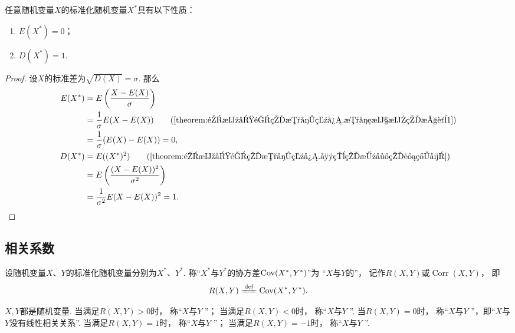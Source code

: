 \begin{property}\label{theorem:随机变量的数字特征.标准化随机变量的数字特征}
任意随机变量\(X\)的标准化随机变量\(X^*\)具有以下性质：
\begin{enumerate}
    \item \(E(X^*)=0\)；
    \item \(D(X^*)=1\).
\end{enumerate}
\begin{proof}
设\(X\)的标准差为\(\sqrt{D(X)}=\sigma\).
那么\begin{align*}
    E(X^*)
	&= E\left(\frac{X-E(X)}{\sigma}\right) \\
	&= \frac1\sigma E(X-E(X))
		\tag{\cref{theorem:随机变量的数字特征.数学期望的性质1}} \\
	&= \frac1\sigma (E(X) - E(X))
	= 0, \\
    D(X^*)
	&= E((X^*)^2)
		\tag{\cref{theorem:随机变量的数字特征.常用的方差的计算式}} \\
	&= E\left(\frac{(X-E(X))^2}{\sigma^2}\right) \\
	&= \frac{1}{\sigma^2} E(X-E(X))^2
	= 1.
    \qedhere
\end{align*}
\end{proof}
\end{property}

\subsection{相关系数}
\begin{definition}\label{definition:随机变量的数字特征.相关系数}
设随机变量\(X\)、\(Y\)的标准化随机变量分别为\(X^*\)、\(Y^*\).
称“\(X^*\)与\(Y^*\)的协方差\(\operatorname{Cov}(X^*,Y^*)\)”为
“\(X\)与\(Y\)的”，
记作\(R(X,Y)\)或\(\operatorname{Corr}(X,Y)\)，
即\[
    R(X,Y) \defeq \Cov(X^*,Y^*).
\]
\end{definition}

\begin{definition}
\(X,Y\)都是随机变量.
当满足\(R(X,Y) > 0\)时，
称“\(X\)与\(Y\) ”；
当满足\(R(X,Y) < 0\)时，
称“\(X\)与\(Y\) ”.
当\(R(X,Y) = 0\)时，
称“\(X\)与\(Y\) ”，即“\(X\)与\(Y\)没有线性相关关系”.
当满足\(R(X,Y) = 1\)时，
称“\(X\)与\(Y\) ”；
当满足\(R(X,Y) = -1\)时，
称“\(X\)与\(Y\) ”.
\end{definition}


